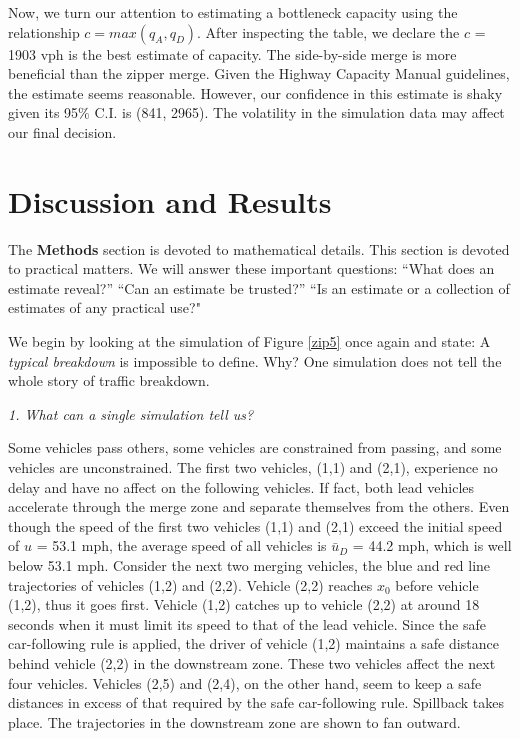 \documentclass[Proceedings]{ascelike}
\begin{document}
Now, we turn our attention to estimating a bottleneck capacity using the relationship $c = max(q_A,q_D)$. After inspecting the table, we declare the $c$ = 1903 vph is the best estimate of capacity. The side-by-side merge is more beneficial than the zipper merge. Given the Highway Capacity Manual guidelines, the estimate seems reasonable. However, our confidence in this estimate is shaky given its 95$\%$ C.I. is (841, 2965). The volatility in the simulation data may affect our final decision.


\section{Discussion and Results}

The \textbf{Methods} section is devoted to mathematical details. This section is devoted to practical matters. We will answer these important questions: ``What does an estimate reveal?'' ``Can an estimate be trusted?'' ``Is an estimate or a collection of estimates of any practical use?" 

We begin by looking at the simulation  of Figure \ref{zip5} once again and state: A \emph{typical breakdown} is impossible to define.  Why? One simulation does not tell the whole story of traffic breakdown. 

\noindent \emph{1. What can a single simulation tell us? }

Some vehicles pass others, some vehicles are constrained from passing, and some vehicles are unconstrained.   The first two vehicles, (1,1) and (2,1), experience no delay and have no affect on the following vehicles. If fact, both lead vehicles accelerate through the merge zone and separate themselves from the others. Even though  the speed  of the first two vehicles (1,1) and (2,1) exceed the initial speed of  $u$ = 53.1 mph, the average speed of all vehicles is $\bar{u}_D$ = 44.2 mph, which is well below 53.1 mph.  Consider the next two merging vehicles,  the blue and red line trajectories of  vehicles (1,2) and (2,2). Vehicle (2,2) reaches $x_0$ before vehicle (1,2), thus it goes first. Vehicle (1,2) catches up to vehicle (2,2) at around 18 seconds when it must limit its speed to that of the lead vehicle.  Since the safe car-following rule is applied, the driver of vehicle (1,2)  maintains a safe distance behind vehicle (2,2) in the downstream zone. These two vehicles affect the next four vehicles. Vehicles (2,5) and (2,4), on the other hand, seem to keep a safe distances in excess of that required by the safe car-following rule. Spillback takes place. The trajectories in the downstream zone are shown to fan outward.  
\end{document}
